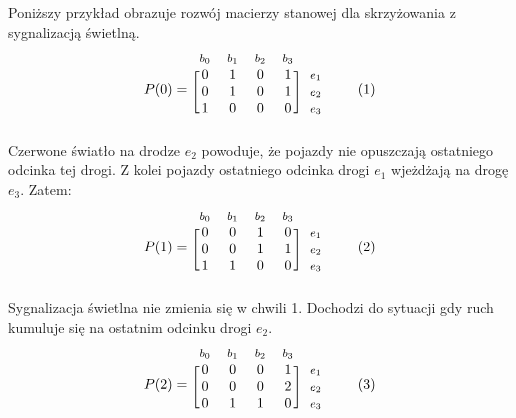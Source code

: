 \documentclass[12pt]{book}
\newcommand\addtag{\refstepcounter{equation}
\tag{\theequation}}
\begin{document}
Poniższy przykład obrazuje rozwój macierzy stanowej dla skrzyżowania z sygnalizacją świetlną.
\begin{equation*}
  P(0)=
  \begin{blockarray}{*{4}{c} l}
    \begin{block}{*{4}{>{$\footnotesize}c<{$}} l}
      $b_0$ & $b_1$ & $b_2$ & $b_3$ \\
    \end{block}
    \begin{block}{[*{4}{c}]>{$\footnotesize}l<{$}}
       0 & 1 & 0 & 1 & $e_1$ \\
       0 & 1 & 0 & 1 & $e_2$ \\
       1 & 0 & 0 & 0 & $e_3$ \\
    \end{block}
  \end{blockarray} \addtag \label{skrz_1_zmiennaStanu_0_sygnalizacja}
\end{equation*}
Czerwone światło na drodze $e_2$ powoduje, że pojazdy nie opuszczają ostatniego odcinka tej drogi. Z kolei pojazdy ostatniego odcinka drogi $e_1$ wjeżdżają na drogę $e_3$. Zatem: 
\begin{equation*}
  P(1)=
  \begin{blockarray}{*{4}{c} l}
    \begin{block}{*{4}{>{$\footnotesize}c<{$}} l}
      $b_0$ & $b_1$ & $b_2$ & $b_3$ \\
    \end{block}
    \begin{block}{[*{4}{c}]>{$\footnotesize}l<{$}}
       0 & 0 & 1 & 0 & $e_1$ \\
       0 & 0 & 1 & 1 & $e_2$ \\
       1 & 1 & 0 & 0 & $e_3$ \\
    \end{block}
  \end{blockarray} \addtag \label{skrz_1_zmiennaStanu_0_sygnalizacja}
\end{equation*}
Sygnalizacja świetlna nie zmienia się w chwili 1. Dochodzi do sytuacji gdy ruch kumuluje się na ostatnim odcinku drogi $e_2$.
\begin{equation*}
  P(2)=
  \begin{blockarray}{*{4}{c} l}
    \begin{block}{*{4}{>{$\footnotesize}c<{$}} l}
      $b_0$ & $b_1$ & $b_2$ & $b_3$ \\
    \end{block}
    \begin{block}{[*{4}{c}]>{$\footnotesize}l<{$}}
       0 & 0 & 0 & 1 & $e_1$ \\
       0 & 0 & 0 & 2 & $e_2$ \\
       0 & 1 & 1 & 0 & $e_3$ \\
    \end{block}
  \end{blockarray} \addtag \label{skrz_1_zmiennaStanu_0_sygnalizacja}
\end{equation*}
\end{document}
